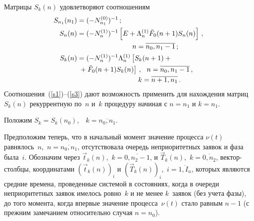 \begin{multicols}{2}
Матрицы $S_k(n)$ удовлетворяют соотношениям
\begin{align}
\label{s1}
S_{n_1}(n_1) &= (-N^{(0)}_{n_1})^{-1}\,;
\\
\label{s2}
S_n(n) &= (-N^{(1)}_{n})^{-1}
\left[ E + \Lambda^{(1)}_{n} \tilde F_0(n+1) S_n(n)
\right]\,,\notag\\
&\hspace*{28mm}n=\overline{n_0,n_1-1}\,;
\\
\label{s3}
S_k(n) &  = (-N^{(1)}_{n})^{-1} \Lambda^{(1)}_{n}
\left[\vphantom{\tilde F_0(n+1)}
S_{k}(n+1) +{}\right.\notag\\
&\left.{}+ \tilde F_0(n+1) S_k(n)
\right]\,,
\ \ n = \overline{n_0,n_1-1}\,,\notag\\
&\hspace*{31mm} k = \overline{n+1,n_1}\,.
\end{align}
Соотношения~(\ref{s1})--(\ref{s3}) дают возможность применить для
нахождения матриц $S_k(n)$ рекуррентную по~$n$ и~$k$ процедуру
начиная с $n=n_1$ и $k=n_1$.

Положим $S_k = S_k(n_0)$,\ \ $k=\overline{n_0,n_1}$.

Предположим теперь, что в начальный момент значение процесса
$\nu(t)$ равнялось~$n$,\  $n=\overline{n_0,n_1}$,
отсутствовала очередь неприоритетных заявок и фаза была~$i$.
Обозначим через $\vec t_k(n)$,\  $k=\overline{0,n_2-1}$,
и $\vec T_k(n)$,\  $k=\overline{0,n_2}$,
вектор-столбцы, координатами $(\vec t_k(n))_i$ и
$(\vec T_k(n))_i$,\ $i=\overline{1,I_{n}}$,
которых являются средние времена, проведенные системой в
состояниях, когда в очереди неприоритетных
заявок имелось ровно~$k$ и не менее $k$~зая\-вок (без учета фазы), до того момента, когда впервые
значение процесса~$\nu(t)$ стало равным $n-1$
(с прежним замечанием относительно случая $n=n_0$).


\end{multicols}
